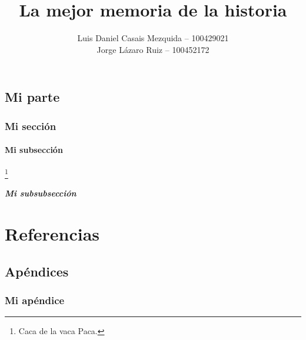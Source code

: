 \documentclass[es]{uc3mreport}
\author{
    Luis Daniel Casais Mezquida -- 100429021\\
    Jorge Lázaro Ruiz -- 100452172
}
\title{La mejor memoria de la historia}
\begin{document}
    \makecover

    \tableofcontents

    \begin{report}
        \part{Mi parte}
        \lipsum[1] \parencite{cicero45finibus}

        \section{Mi sección}
        \lipsum[1]

        \subsection{Mi subsección}
        \lipsum[2-4]\footnote{Caca de la vaca Paca.}


        \subsubsection{Mi subsubsección}
        \lipsum[2-4]
    \end{report}


    \label{bibliography}
    \part{Referencias}
    \printbibliography

    \begin{appendices}
        \part{Apéndices}  %
        \section{Mi apéndice}
        \lipsum[1]
    \end{appendices}
\end{document}
